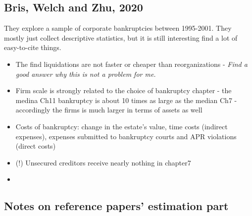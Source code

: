 \documentclass[12pt]{article}
\begin{document}
\subsection*{Bris, Welch and Zhu, 2020 \checkmark}

They explore a sample of corporate bankruptcies between 1995-2001. They mostly just collect descriptive statistics, but it is still interesting find a lot of easy-to-cite things. 
\begin{itemize}\setlength\itemsep{0em} \small
    \item The find liquidations are not faster or cheaper than reorganizations - \textit{Find a good answer why this is not a problem for me.}
    \item Firm scale is strongly related to the choice of bankruptcy chapter - the medina Ch11 bankruptcy is about 10 times as large as the median Ch7 - accordingly the firms is much larger in terms of assets as well
    \item Costs of bankruptcy: change in the estate's value, time costs (indirect expenses), expenses submitted to bankruptcy courts and APR violations (direct costs) 
    \item (!) Unsecured creditors receive nearly nothing in chapter7 
    \item 
\end{itemize} \normalsize

\newpage
\subsection*{Notes on reference papers' estimation part}
\end{document}
